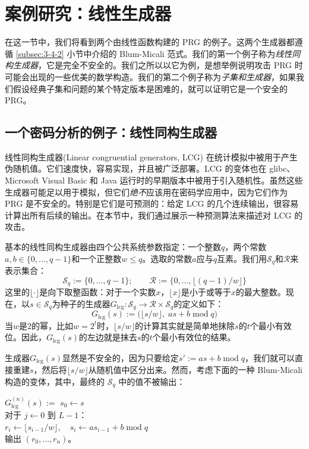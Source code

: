 \section{案例研究：线性生成器}

在这一节中，我们将看到两个由线性函数构建的 PRG 的例子。这两个生成器都遵循 \ref{subsec:3-4-2} 小节中介绍的 Blum-Micali 范式。我们的第一个例子称为\emph{线性同构生成器}，它是完全不安全的。我们之所以以它为例，是想举例说明攻击 PRG 时可能会出现的一些优美的数学构造。我们的第二个例子称为\emph{子集和生成器}，如果我们假设经典子集和问题的某个特定版本是困难的，就可以证明它是一个安全的 PRG。

\subsection{一个密码分析的例子：线性同构生成器}

线性同构生成器(Linear congruential generators, LCG) 在统计模拟中被用于产生伪随机值。它们速度快，容易实现，并且被广泛部署。LCG 的变体也在 glibc、Microsoft Visual Basic 和 Java 运行时的早期版本中被用于引入随机性。虽然这些生成器可能足以用于模拟，但它们\emph{绝不}应该用在密码学应用中，因为它们作为 PRG 是不安全的。特别是它们是可预测的：给定 LCG 的几个连续输出，很容易计算出所有后续的输出。在本节中，我们通过展示一种预测算法来描述对 LCG 的攻击。

基本的线性同构生成器由四个公共系统参数指定：一个整数$q$，两个常数$a,b\in\{0,\dots,q-1\}$和一个正整数$w\leq q$。选取的常数$a$应与$q$互素。我们用$\mathcal{S}_q$和$\mathcal{R}$来表示集合：
\[
\mathcal{S}_q:=\{0,\dots,q-1\};\quad\quad
\mathcal{R}:=\{0,\dots,\lfloor(q-1)/w\rfloor\}
\]
这里的$\lfloor\cdot\rfloor$是向下取整函数：对于一个实数$x$，$\lfloor x\rfloor$是小于或等于$x$的最大整数。现在，以$s\in\mathcal{S}_q$为种子的生成器$G_\mathrm{lcg}:\mathcal{S}_q\to\mathcal{R}\times\mathcal{S}_q$的定义如下：
\[
G_\mathrm{lcg}(s):=\big(
\lfloor s/w \rfloor,\;
as+b\;\mathrm{mod}\;q
\big)
\]
当$w$是$2$的幂，比如$w=2^t$时，$\lfloor s/w \rfloor$的计算其实就是简单地抹除$s$的$t$个最小有效位。因此，$G_\mathrm{lcg}(s)$的左边就是抹去$s$的$t$个最小有效位的结果。

生成器$G_\mathrm{lcg}(s)$显然是不安全的，因为只要给定$s':=as+b\;\mathrm{mod}\;q$，我们就可以直接重建$s$，然后将$\lfloor s/w \rfloor$从随机值中区分出来。然而，考虑下面的一种 Blum-Micali 构造的变体，其中，最终的 $\mathcal{S}_q$ 中的值不被输出：

\vspace*{5pt}

\hspace*{5pt} $G_\mathrm{lcg}^{(n)}(s):=$
\hspace*{20pt} $s_0\leftarrow s$\\
\hspace*{100pt} 对于 $j\leftarrow0$ 到 $L-1$：\\
\hspace*{100pt} \quad\quad\quad$r_i\leftarrow\lfloor s_{i-1}/w \rfloor,\quad s_i\leftarrow as_{i-1}+b\;\mathrm{mod}\;q$\\
\hspace*{100pt} 输出 $(r_0,\dots,r_n)$。


